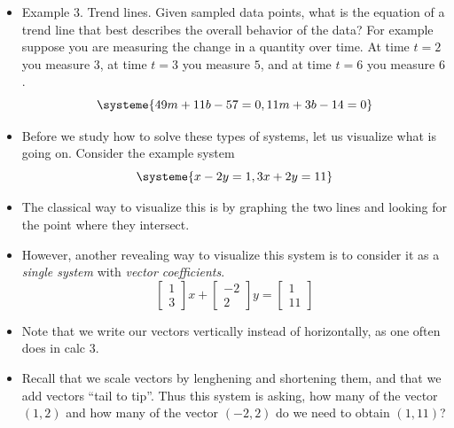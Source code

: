 \documentclass[11pt,oneside]{amsbook}
\theoremstyle{definition}
\theoremstyle{plain}
\theoremstyle{definition}
\theoremstyle{remark}
\numberwithin{equation}{section}
\numberwithin{figure}{section}
\begin{document}
\begin{itemize}
\begin{center}
  \end{center}
  Assume that for each intersection, the number of cars entering it is the same as the number of cars leaving it. What are the values of the unknowns?
  \[\begin{cases}x+640=y+310\\y+450=z+610\\z+520=w+480\\w+390=x+600\end{cases}
  \]
\item Example 3. Trend lines. Given sampled data points, what is the equation of a trend line that best describes the overall behavior of the data? For example suppose you are measuring the change in a quantity over time. At time $t=2$ you measure $3$, at time $t=3$ you measure $5$, and at time $t=6$ you measure $6$.
  \[\systeme{49m+11b-57=0,11m+3b-14=0}
  \]
\item Before we study how to solve these types of systems, let us visualize what is going on. Consider the example system
  \[\systeme{x-2y=1,3x+2y=11}
  \]
\item The classical way to visualize this is by graphing the two lines and looking for the point where they intersect.
  \begin{center}
  \end{center}
\item However, another revealing way to visualize this system is to consider it as a \emph{single system} with \emph{vector coefficients}.
  \[\begin{bmatrix}1\\3\end{bmatrix}x+\begin{bmatrix}-2\\2\end{bmatrix}y
    =\begin{bmatrix}1\\11\end{bmatrix}
  \]
\item Note that we write our vectors vertically instead of horizontally, as one often does in calc 3.
\item Recall that we scale vectors by lenghening and shortening them, and that we add vectors ``tail to tip''. Thus this system is asking, how many of the vector $(1,2)$ and how many of the vector $(-2,2)$ do we need to obtain $(1,11)$?


\end{itemize}
\end{document}
